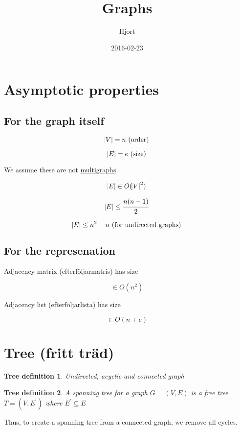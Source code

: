 \documentclass{article}
\title{Graphs}
\date{2016-02-23}
\author{Hjort}
\newtheorem{treedef}{Tree definition}
\begin{document}
  \maketitle

  \section{Asymptotic properties}

      \subsection{For the graph itself}

      $$\abs{V} = n \text{ (order)}$$

      $$\abs{E} = e \text{ (size)}$$

      We assume these are not \href{https://en.wikipedia.org/wiki/Multigraph}{multigraphs}.

      $$ \abs{E} \in O(\abs{V}^2) $$

      $$\abs{E} \leq \cfrac{n(n-1)}{2}$$

      $$\abs{E} \leq n^2 - n \text{ (for undirected graphs)}$$

      \subsection{For the represenation}

      Adjacency matrix (efterföljarmatris) has size 
      
      $$ \in O(n^2)$$

      Adjacency list (efterföljarlista) has size
      
      $$\in O(n + e)$$

      \section{Tree (fritt träd)}

      \begin{treedef}
          Undirected, acyclic and connected graph
      \end{treedef}

      \begin{treedef}
          A spanning tree for a graph $G = (V, E)$ is a free tree
          $T=(V,E^{\prime})$ where $E^{\prime} \subseteq E$ 
      \end{treedef}

      Thus, to create a spanning tree from a connected graph, we remove all
      cycles.
      
 


\end{document}
